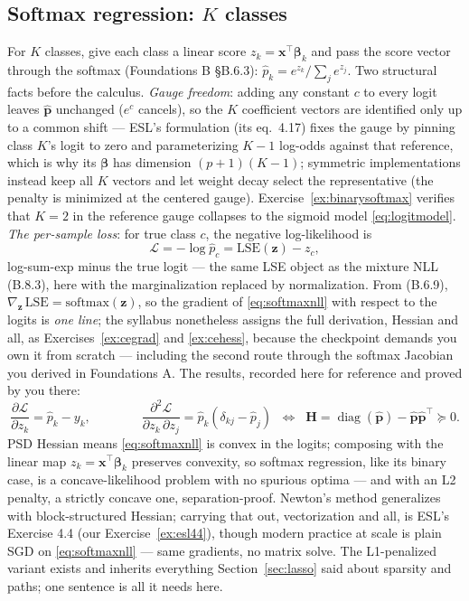 \documentclass[11pt]{article}
\numberwithin{equation}{section}
\theoremstyle{plain}
\theoremstyle{definition}
\theoremstyle{remark}
\DeclareMathOperator{\diag}{diag}
\newcommand{\x}{\bm{x}}
\newcommand{\bbeta}{\bm{\beta}}
\newcommand{\T}{\top}
\begin{document}
\subsection{Softmax regression: $K$ classes}\label{sec:softmaxreg}

For $K$ classes, give each class a linear score $z_k = \x^\T \bbeta_k$ and pass the score vector through the softmax (Foundations B \S B.6.3): $\hat p_k = e^{z_k} / \sum_j e^{z_j}$. Two structural facts before the calculus. \emph{Gauge freedom}: adding any constant $c$ to every logit leaves $\hat{\bm p}$ unchanged ($e^c$ cancels), so the $K$ coefficient vectors are identified only up to a common shift --- ESL's formulation (its eq.\ 4.17) fixes the gauge by pinning class $K$'s logit to zero and parameterizing $K-1$ log-odds against that reference, which is why its $\bbeta$ has dimension $(p+1)(K-1)$; symmetric implementations instead keep all $K$ vectors and let weight decay select the representative (the penalty is minimized at the centered gauge). Exercise~\ref{ex:binarysoftmax} verifies that $K = 2$ in the reference gauge collapses to the sigmoid model \eqref{eq:logitmodel}. \emph{The per-sample loss}: for true class $c$, the negative log-likelihood is
\begin{equation}
\mathcal{L} = -\log \hat p_c = \mathrm{LSE}(\bm{z}) - z_c ,
\label{eq:softmaxnll}
\end{equation}
log-sum-exp minus the true logit --- the same LSE object as the mixture NLL (B.8.3), here with the marginalization replaced by normalization. From (B.6.9), $\nabla_{\bm z}\,\mathrm{LSE} = \mathrm{softmax}(\bm z)$, so the gradient of \eqref{eq:softmaxnll} with respect to the logits is \emph{one line}; the syllabus nonetheless assigns the full derivation, Hessian and all, as Exercises~\ref{ex:cegrad} and \ref{ex:cehess}, because the checkpoint demands you own it from scratch --- including the second route through the softmax Jacobian you derived in Foundations A. The results, recorded here for reference and proved by you there:
\begin{equation}
\frac{\partial \mathcal{L}}{\partial z_k} = \hat p_k - y_k,
\qquad\qquad
\frac{\partial^2 \mathcal{L}}{\partial z_k\, \partial z_j} = \hat p_k(\delta_{kj} - \hat p_j)
\;\;\Longleftrightarrow\;\;
\bm{H} = \diag(\hat{\bm p}) - \hat{\bm p}\hat{\bm p}^\T \succeq 0 .
\label{eq:cegradhess}
\end{equation}
PSD Hessian means \eqref{eq:softmaxnll} is convex in the logits; composing with the linear map $z_k = \x^\T\bbeta_k$ preserves convexity, so softmax regression, like its binary case, is a concave-likelihood problem with no spurious optima --- and with an L2 penalty, a strictly concave one, separation-proof. Newton's method generalizes with block-structured Hessian; carrying that out, vectorization and all, is ESL's Exercise 4.4 (our Exercise~\ref{ex:esl44}), though modern practice at scale is plain SGD on \eqref{eq:softmaxnll} --- same gradients, no matrix solve. The L1-penalized variant exists and inherits everything Section~\ref{sec:lasso} said about sparsity and paths; one sentence is all it needs here.
\end{document}
